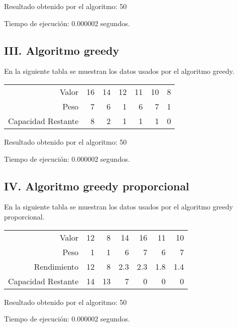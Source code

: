 \documentclass{article}
\begin{document}
Resultado obtenido por el algoritmo: 50

Tiempo de ejecución: 0.000002 segundos.
\subsection*{III. Algoritmo greedy}
En la siguiente tabla se muestran los datos usados por el algoritmo greedy.
\begin{table}[h]
\centering
\begin{tabular}{r|rrrrrr}
Valor&16&14&12&11&10&8\\
Peso&7&6&1&6&7&1\\
\hline Capacidad Restante&8&2&1&1&1&0\\
\end{tabular}
\end{table}

Resultado obtenido por el algoritmo: 50

Tiempo de ejecución: 0.000002 segundos.
\subsection*{IV. Algoritmo greedy proporcional}
En la siguiente tabla se muestran los datos usados por el algoritmo greedy proporcional.
\begin{table}[h]
\centering
\begin{tabular}{r|rrrrrr}
Valor&12&8&14&16&11&10\\
Peso&1&1&6&7&6&7\\
Rendimiento&12&8&2.3&2.3&1.8&1.4\\
\hline Capacidad Restante&14&13&7&0&0&0\\
\end{tabular}
\end{table}

Resultado obtenido por el algoritmo: 50

Tiempo de ejecución: 0.000002 segundos.
\end{document}
